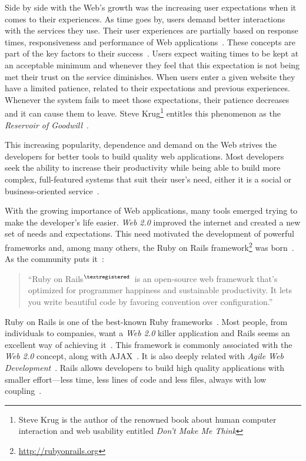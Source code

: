 Side by side with the Web's growth was the increasing user expectations when it comes to their experiences. As time goes by, users demand better interactions with the services they use. Their user experiences are partially based on response times, responsiveness and performance of Web applications~\cite{prioritizing_web_usability}. These concepts are part of the key factors to their success~\cite{responsiveness}. Users expect waiting times to be kept at an acceptable minimum and whenever they feel that this expectation is not being met their trust on the service diminishes. When users enter a given website they have a limited patience, related to their expectations and previous experiences. Whenever the system fails to meet those expectations, their patience decreases and it can cause them to leave. Steve Krug\footnote{Steve Krug is the author of the renowned book about human computer interaction and web usability entitled \textit{Don't Make Me Think}} entitles this phenomenon as the \textit{Reservoir of Goodwill}~\cite{dont_make_me_think}.

This increasing popularity, dependence and demand on the Web strives the developers for better tools to build quality web applications. Most developers seek the ability to increase their productivity while being able to build more complex, full-featured systems that suit their user's need, either it is a social or business-oriented service~\cite{comparison_agile_frameworks}.

With the growing importance of Web applications, many tools emerged trying to make the developer's life easier. \textit{Web 2.0} improved the internet and created a new set of needs and expectations. This need motivated the development of powerful frameworks and, among many others, the Ruby on Rails framework\footnote{\url{http://rubyonrails.org}} was born~\cite{what_is_web20}. As the community puts it~\cite{rubyonrails}:
\begin{quote}
  ``Ruby on Rails$^{\scriptsize \textregistered}$~is an open-source web framework that's optimized for programmer happiness and sustainable productivity. It lets you write beautiful code by favoring convention over configuration.''
\end{quote}
Ruby on Rails is one of the best-known Ruby frameworks~\cite{agile_webdevelopment_with_rails}. Most people, from individuals to companies, want a \textit{Web 2.0} killer application and Rails seems an excellent way of achieving it~\cite{oo_business_models}. This framework is commonly associated with the \textit{Web 2.0} concept, along with AJAX~\cite{spaghetti_code}. It is also deeply related with \textit{Agile Web Development}~\cite{agile_webdevelopment_with_rails}. Rails allows developers to build high quality applications with smaller effort---less time, less lines of code and less files, always with low coupling~\cite{maintainability_web_applications_j2ee_dotnet_ror}.

